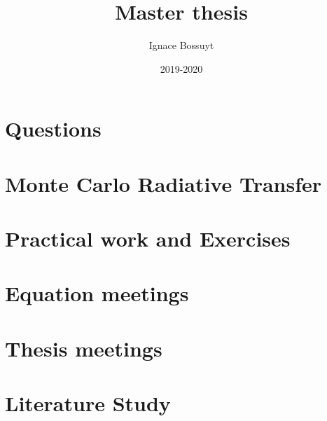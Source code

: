 \documentclass[a4paper,10pt,twoside]{article}
\title{Master thesis}
\author{Ignace Bossuyt}
\date{2019-2020}
\begin{document}
\maketitle
\tableofcontents

\cleardoublepage
\part{Questions}


\cleardoublepage
\part{Monte Carlo Radiative Transfer}


\cleardoublepage
\part{Practical work and Exercises}


\cleardoublepage
\part{Equation meetings}


\cleardoublepage
\part{Thesis meetings}


\cleardoublepage
\part*{Literature Study}


\medskip
\newpage
\printbibliography
\end{document}
